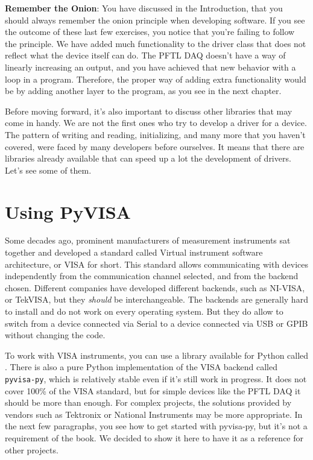 \textbf{Remember the Onion}: You have discussed in the Introduction, that you should always remember the onion principle when developing software. If you see the outcome of these last few exercises, you notice that you're failing to follow the principle. We have added much functionality to the driver class that does not reflect what the device itself can do. The {PFTL DAQ} doesn't have a way of linearly increasing an output, and you have achieved that new behavior with a loop in a program. Therefore, the proper way of adding extra functionality would be by adding another layer to the program, as you see in the next chapter.

Before moving forward, it's also important to discuss other libraries that may come in handy. We are not the first ones who try to develop a driver for a device. The pattern of writing and reading, initializing, and many more that you haven't covered, were faced by many developers before ourselves. It means that there are libraries already available that can speed up a lot the development of drivers. Let's see some of them.

\section{Using PyVISA}\label{sec:pyvisa}
Some decades ago, prominent manufacturers of measurement instruments sat together and developed a standard called Virtual instrument software architecture, or VISA for short. This standard allows communicating with devices independently from the communication channel selected, and from the backend chosen. Different companies have developed different backends, such as NI-VISA, or TekVISA, but they \emph{should} be interchangeable. The backends are generally hard to install and do not work on every operating system. But they do allow to switch from a device connected via Serial to a device connected via USB or GPIB without changing the code.

To work with VISA instruments, you can use a library available for Python called . There is also a pure Python implementation of the VISA backend called \texttt{pyvisa-py}, which is relatively stable even if it's still work in progress. It does not cover 100\% of the VISA standard, but for simple devices like the {PFTL DAQ} it should be more than enough. For complex projects, the solutions provided by vendors such as Tektronix or National Instruments may be more appropriate. In the next few paragraphs, you see how to get started with pyvisa-py, but it's not a requirement of the book. We decided to show it here to have it as a reference for other projects.

